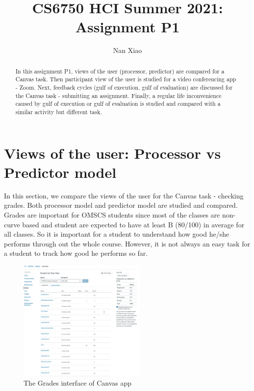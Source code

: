 \documentclass[
	letterpaper, %
]{jdf}
\author{Nan Xiao}
\title{CS6750 HCI Summer 2021:\\Assignment P1}
\begin{document}

\maketitle

\begin{abstract}
	In this assignment P1, views of the user (processor, predictor) are compared for a Canvas task. Then participant view of the user is studied for a video conferencing app - Zoom. Next, feedback cycles (gulf of execution, gulf of evaluation) are discussed for the Canvas task - submitting an assignment. Finally, a regular life inconvenience caused by gulf of execution or gulf of evaluation is studied and compared with a similar activity but different task.
\end{abstract}

\section{Views of the user: Processor vs Predictor model}
In this section, we compare the views of the user for the Canvas task - checking grades. Both processor model and predictor model are studied and compared. Grades are important for OMSCS students since most of the classes are non-curve based and student are expected to have at least B (80/100) in average for all classes. So it is important for a student to understand how good he/she performs through out the whole course. However, it is not always an easy task for a student to track how good he performs so far.

\begin{figure}[h]
	\centering
	\includegraphics[height=6cm]{Figures/canvas_grades.png}
	\caption{The Grades interface of Canvas app}
	\label{fig:canvas_grades}
\end{figure}
\end{document}
